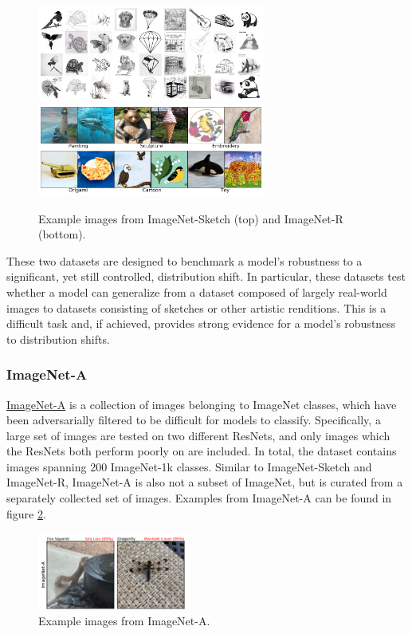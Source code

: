 \documentclass{article}
\begin{document}
\begin{figure}[h]
    \centering
    \includegraphics[width=7.5cm]{images/sketch.jpeg}
    \includegraphics[width=7.5cm]{images/renditions.png}
    \caption{Example images from ImageNet-Sketch (top) and ImageNet-R (bottom).}
    \label{fig:renditions}
\end{figure}

These two datasets are designed to benchmark a model's robustness to a significant, yet still controlled, distribution shift. In particular, these datasets test whether a model can generalize from a dataset composed of largely real-world images to datasets consisting of sketches or other artistic renditions. This is a difficult task and, if achieved, provides strong evidence for a model's robustness to distribution shifts.

\subsubsection{ImageNet-A}
\href{https://paperswithcode.com/sota/domain-generalization-on-imagenet-a}{ImageNet-A} \cite{hendrycks2021natural} is a collection of images belonging to ImageNet classes, which have been adversarially filtered to be difficult for models to classify. Specifically, a large set of images are tested on two different ResNets, and only images which the ResNets both perform poorly on are included. In total, the dataset contains images spanning 200 ImageNet-1k classes. Similar to ImageNet-Sketch and ImageNet-R, ImageNet-A is also not a subset of ImageNet, but is curated from a separately collected set of images. Examples from ImageNet-A can be found in figure \ref{fig:adversarial}.

\begin{figure}[h]
    \centering
    \includegraphics[width=5cm]{images/adversarial.png}
    \caption{Example images from ImageNet-A.}
    \label{fig:adversarial}
\end{figure}
\end{document}
